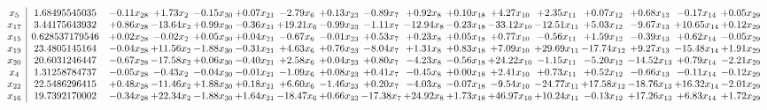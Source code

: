 \documentclass[9pt]{article}
\begin{document}
 \[\begin{array}{c| c c@{\hskip 2pt} c@{\hskip 2pt} c@{\hskip 2pt} c@{\hskip 2pt} c@{\hskip 2pt} c@{\hskip 2pt} c@{\hskip 2pt} c@{\hskip 2pt} c@{\hskip 2pt} c@{\hskip 2pt} c@{\hskip 2pt} c@{\hskip 2pt} c@{\hskip 2pt} c@{\hskip 2pt} c@{\hskip 2pt} }
 x_{5}   &  1.68495545035 & -0.11 x_{28} & +  1.73 x_{2} & -0.15 x_{30} & +  0.07 x_{21} & -2.79 x_{6} & +  0.13 x_{23} & -0.89 x_{7} & +  0.92 x_{8} & +  0.10 x_{18} & +  4.27 x_{10} & +  2.35 x_{11} & +  0.07 x_{12} & +  0.68 x_{13} & -0.17 x_{14} & +  0.05 x_{29}\\
 x_{17}   &  3.44175643932 & +  0.86 x_{28} & -13.64 x_{2} & +  0.99 x_{30} & -0.36 x_{21} & + 19.21 x_{6} & -0.99 x_{23} & -1.11 x_{7} & -12.94 x_{8} & -0.23 x_{18} & -33.12 x_{10} & -12.51 x_{11} & +  5.03 x_{12} & -9.67 x_{13} & + 10.65 x_{14} & +  0.12 x_{29}\\
 x_{15}   &  0.628537179546 & +  0.02 x_{28} & -0.02 x_{2} & +  0.05 x_{30} & +  0.04 x_{21} & -0.67 x_{6} & -0.01 x_{23} & +  0.53 x_{7} & +  0.23 x_{8} & +  0.05 x_{18} & +  0.77 x_{10} & -0.56 x_{11} & +  1.59 x_{12} & -0.39 x_{13} & +  0.62 x_{14} & -0.05 x_{29}\\
 x_{19}   &  23.4805145164 & -0.04 x_{28} & + 11.56 x_{2} & -1.88 x_{30} & -0.31 x_{21} & +  4.63 x_{6} & +  0.76 x_{23} & -8.04 x_{7} & +  1.31 x_{8} & +  0.83 x_{18} & +  7.09 x_{10} & + 29.69 x_{11} & -17.74 x_{12} & +  9.27 x_{13} & -15.48 x_{14} & +  1.91 x_{29}\\
 x_{20}   &  20.6031246447 & -0.67 x_{28} & -17.58 x_{2} & +  0.06 x_{30} & -0.40 x_{21} & +  2.58 x_{6} & +  0.04 x_{23} & +  0.80 x_{7} & -4.23 x_{8} & -0.56 x_{18} & + 24.22 x_{10} & -1.15 x_{11} & -5.20 x_{12} & -14.52 x_{13} & +  0.79 x_{14} & -2.21 x_{29}\\
 x_{4}   &  1.31258784737 & -0.05 x_{28} & -0.43 x_{2} & -0.04 x_{30} & -0.01 x_{21} & -1.09 x_{6} & +  0.08 x_{23} & +  0.41 x_{7} & -0.45 x_{8} & +  0.00 x_{18} & +  2.41 x_{10} & +  0.73 x_{11} & +  0.52 x_{12} & -0.66 x_{13} & -0.11 x_{14} & -0.12 x_{29}\\
 x_{22}   &  22.5486296415 & +  0.48 x_{28} & -11.46 x_{2} & +  1.88 x_{30} & +  0.18 x_{21} & +  6.60 x_{6} & -1.46 x_{23} & +  0.20 x_{7} & -4.03 x_{8} & -0.07 x_{18} & -9.54 x_{10} & -24.77 x_{11} & + 17.58 x_{12} & -18.76 x_{13} & + 16.32 x_{14} & -2.01 x_{29}\\
 x_{16}   &  19.7392170002 & -0.34 x_{28} & + 22.34 x_{2} & -1.88 x_{30} & +  1.64 x_{21} & -18.47 x_{6} & +  0.66 x_{23} & -17.38 x_{7} & + 24.92 x_{8} & +  1.73 x_{18} & + 46.97 x_{10} & + 10.24 x_{11} & -0.13 x_{12} & + 17.26 x_{13} & +  6.83 x_{14} & +  1.72 x_{29}\\

\end{array}\]
\end{document}
